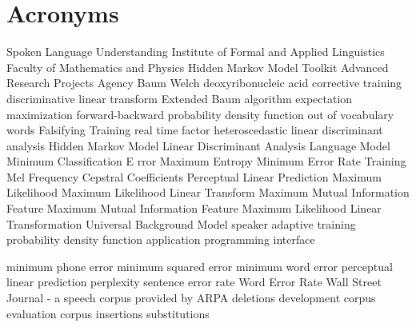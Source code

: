 \chapter{Acronyms}
\label{cha:acronyms}

\begin{acronym}[TDMA]
     {Spoken Language Understanding}
     {Institute of Formal and Applied Linguistics}
     {Faculty of Mathematics and Physics}
     {Hidden Markov Model Toolkit}
     {Advanced Research Projects Agency}
     {Baum Welch}
     {deoxyribonucleic acid}
     {corrective training}
     {discriminative linear transform}
     {Extended Baum algorithm}
     {expectation maximization}
     {forward-backward}
     {probability density function}
     {out of vocabulary words}
     {Falsifying Training}
     {real time factor}
     {heteroscedastic linear discriminant analysis}
     {Hidden Markov Model}
     {Linear Discriminant Analysis}
     {Language Model}
     {Minimum Classification E rror}
     {Maximum Entropy}
     {Minimum Error Rate Training}
     {Mel Frequency Cepstral Coefficients}
     {Perceptual Linear Prediction}
     {Maximum Likelihood}
     {Maximum Likelihood Linear Transform}
     {Maximum Mutual Information}
     {Feature Maximum Mutual Information}
     {Feature Maximum Likelihood Linear Transformation}
     {Universal Background Model}
     {speaker adaptive training}
     {probability density function}
     {application programming interface}

     {minimum phone error}
     {minimum squared error}
     {minimum word error}
     {perceptual linear prediction}
     {perplexity}
     {sentence error rate}
     {Word Error Rate}
     {Wall Street Journal - a speech corpus provided by ARPA}
     {deletions}
     {development corpus}
     {evaluation corpus}
     {insertions}
     {substitutions}
\end{acronym}

